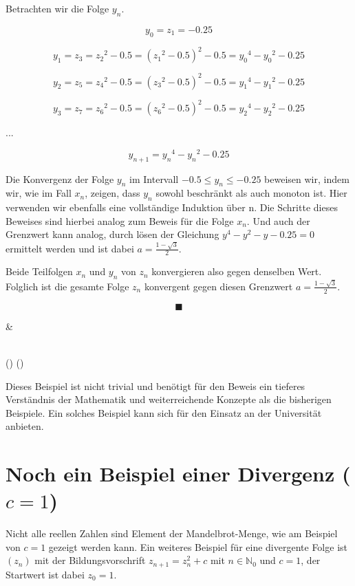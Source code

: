 \documentclass[a4paper, 12pt]{book}
\begin{document}
\begin{longtable}[]
\begin{minipage}[b]{\linewidth}
Betrachten wir die Folge \(y_{n}\).

\[y_{0} = z_{1} =  - 0.25\]

\[y_{1}{= z}_{3} = {z_{2}}^{2} - 0.5 = ({z_{1}}^{2} - 0.5)^{2} - 0.5 = {y_{0}}^{4} - {y_{0}}^{2} - 0.25\]

\[y_{2} = z_{5} = {z_{4}}^{2} - 0.5 = ({z_{3}}^{2} - 0.5)^{2} - 0.5 = {y_{1}}^{4} - {y_{1}}^{2} - 0.25\]

\[y_{3} = z_{7} = {z_{6}}^{2} - 0.5 = ({z_{6}}^{2} - 0.5)^{2} - 0.5 = {y_{2}}^{4} - {y_{2}}^{2} - 0.25\]

...

\[y_{n + 1} = {y_{n}}^{4} - {y_{n}}^{2} - 0.25\]

Die Konvergenz der Folge \(y_{n}\) im Intervall
\(- 0.5{\leq y}_{n} \leq  - 0.25\) beweisen wir, indem wir,
wie im Fall \(x_{n}\), zeigen, dass \(y_{n}\) sowohl beschränkt als auch
monoton ist. Hier verwenden wir ebenfalls eine vollständige Induktion
über n. Die Schritte dieses Beweises sind hierbei analog zum Beweis für
die Folge \(x_{n}\). Und auch der Grenzwert kann analog, durch lösen der
Gleichung \(y^{4} - y^{2} - y - 0.25 = 0\) ermittelt
werden und ist dabei \(a = \frac{1 - \sqrt{3}}{2}\).

Beide Teilfolgen \(x_{n}\) und \(y_{n}\) von \(z_{n}\) konvergieren also
gegen denselben Wert. Folglich ist die gesamte Folge \(z_{n}\)
konvergent gegen diesen Grenzwert \(a = \frac{1 - \sqrt{3}}{2}\).

\[\blacksquare\]
\end{minipage} & \begin{minipage}[b]{\linewidth}\raggedright
\end{minipage} \\
\midrule()
\endhead
\bottomrule()
\end{longtable}

Dieses Beispiel ist nicht trivial und benötigt für den Beweis ein
tieferes Verständnis der Mathematik und weiterreichende Konzepte als die
bisherigen Beispiele. Ein solches Beispiel kann sich für den Einsatz an
der Universität anbieten.

\section{Noch ein Beispiel einer Divergenz ($c=1$)}

Nicht alle reellen Zahlen sind Element der Mandelbrot-Menge, wie am
Beispiel von \(c = 1\) gezeigt werden kann. Ein weiteres Beispiel
für eine divergente Folge ist \(\left( z_{n} \right)\) mit der
Bildungsvorschrift \(z_{n + 1} = z_{n}^{2} + c\) mit
\(n \in \mathbb{N}_{0}\) und \(c = 1\), der Startwert ist dabei
\(z_{0} = 1\).
\end{document}
